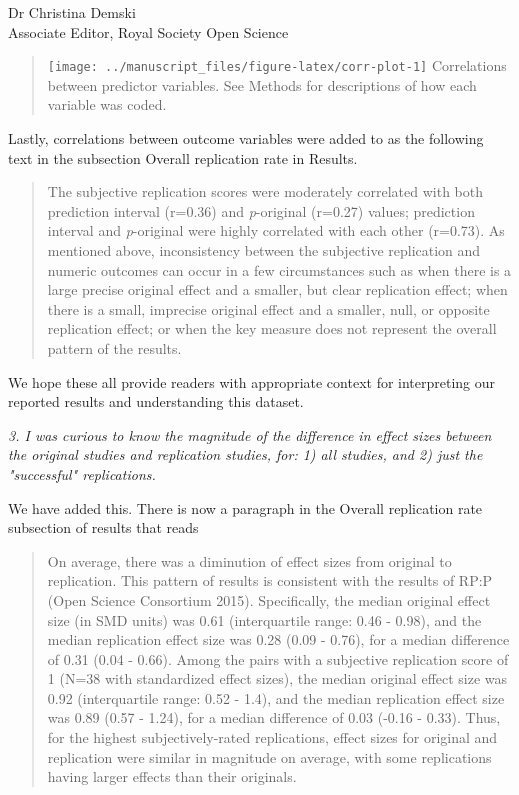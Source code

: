 \documentclass{stanfordletter}
\newcommand{\theysaid}[1]{\begin{leftbar} \noindent 
		\textsl{ #1}\end{leftbar}}
\newcommand{\revised}[1]{\begin{quote}	#1 \end{quote}}
\begin{document}
\begin{letter}{Dr Christina Demski \\ Associate Editor, Royal Society Open Science}
          \revised{
          		\texttt{[image: ../manuscript\_files/figure-latex/corr-plot-1]}
          		{Correlations between predictor variables. See Methods for descriptions of how each variable was coded. }
         }
         
         Lastly, correlations between outcome variables were added to as the following text in the subsection Overall replication rate in Results.
         
         \revised{The subjective replication scores were moderately correlated with both prediction interval (r=0.36) and \emph{p}-original (r=0.27) values; prediction interval and \emph{p}-original were highly correlated with each other (r=0.73). As mentioned above, inconsistency between the subjective replication and numeric outcomes can occur in a few circumstances such as when there is a large precise original effect and a smaller, but clear replication effect; when there is a small, imprecise original effect and a smaller, null, or opposite replication effect; or when the key measure does not represent the overall pattern of the results.
         }
         
         We hope these all provide readers with appropriate context for interpreting our reported results and understanding this dataset. 
          
          \theysaid{
          	3. I was curious to know the magnitude of the difference in effect sizes between the original studies and replication studies, for: 1) all studies, and 2) just the "successful" replications.
          }
          
          We have added this. There is now a paragraph in the Overall replication rate subsection of results that reads
          
          \revised{On average, there was a diminution of effect sizes from original to replication. This pattern of results is consistent with the results of RP:P (Open Science Consortium 2015). Specifically, the median original effect size (in SMD units) was 0.61 (interquartile range: 0.46 - 0.98), and the median replication effect size was 0.28 (0.09 - 0.76), for a median difference of 0.31 (0.04 - 0.66). Among the pairs with a subjective replication score of 1 (N=38 with standardized effect sizes), the median original effect size was 0.92 (interquartile range: 0.52 - 1.4), and the median replication effect size was 0.89 (0.57 - 1.24), for a median difference of 0.03 (-0.16 - 0.33). Thus, for the highest subjectively-rated replications, effect sizes for original and replication were similar in magnitude on average, with some replications having larger effects than their originals.
          }
          

\end{letter}
\end{document}
